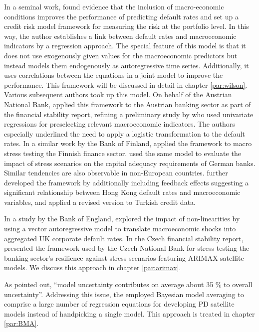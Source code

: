 \documentclass[a4paper, 12pt]{scrreprt}
\begin{document}
In a seminal work, \textcite{wilson1997wilsonI} found evidence that the inclusion of macro-economic conditions improves the performance of predicting default rates and set up a credit risk model framework for measuring the risk at the portfolio level. In this way, the author establishes a link between default rates and macroeconomic indicators by a regression approach. The special feature of this model is that it does not use exogenously given values for the macroeconomic predictors but instead models them endogenously as autoregressive time series. Additionally, it uses correlations between the equations in a joint model to improve the performance. This framework will be discussed in detail in chapter \ref{par:wilson}. Various subsequent authors took up this model.
On behalf of the Austrian National Bank, \textcite{boss2002austria} applied this framework to the Austrian banking sector as part of the financial stability report, refining a preliminary study by \textcite{kalirai2002austria} who used univariate regressions for preselecting relevant macroeconomic indicators. The authors especially underlined the need to apply a logistic transformation to the default rates.
In a similar work by the Bank of Finland, \textcite{virolainen2004finland} applied the \textcite{wilson1997wilsonI} framework to macro stress testing the Finnish finance sector.
\textcite{buhn2007germany} used the same model to evaluate the impact of stress scenarios on the capital adequacy requirements of German banks.
Similar tendencies are also observable in non-European countries.
\textcite{wong2006framework} further developed the \textcite{wilson1997wilsonI} framework by additionally including feedback effects suggesting a significant relationship between Hong Kong default rates and macroeconomic variables, and \textcite{kuccukozmen2006turkey} applied a revised version to Turkish credit data.

In a study by the Bank of England, \textcite{drehmann2006nonlinearities} explored the impact of non-linearities by using a vector autoregressive model to translate macroeconomic shocks into aggregated UK corporate default rates.
In the Czech financial stability report, \textcite{gersl2012dynamic} presented the framework used by the Czech National Bank for stress testing the banking sector's resilience against stress scenarios featuring ARIMAX satellite models. We discuss this approach in chapter \ref{par:arimax}.

As \textcite{gross2017implications} pointed out, ``model uncertainty contributes on average about 35 \% to overall uncertainty''. Addressing this issue, the \textcite{ecb2017stampe} employed Bayesian model averaging to comprise a large number of regression equations for developing PD satellite models instead of handpicking a single model. This approach is treated in chapter \ref{par:BMA}.
\end{document}

